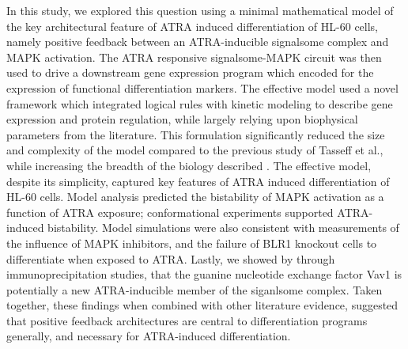 \documentclass[12pt]{article}
\begin{document}
In this study, we explored this question using a minimal mathematical model of the key architectural feature of ATRA induced differentiation of HL-60 cells,
namely positive feedback between an ATRA-inducible signalsome complex and MAPK activation.
The ATRA responsive signalsome-MAPK circuit was then used to drive a downstream gene expression program which encoded for the expression of functional differentiation markers.
The effective model used a novel framework which integrated logical rules with kinetic modeling to describe gene expression and protein regulation,
while largely relying upon biophysical parameters from the literature.
This formulation significantly reduced the size and complexity of the model compared to the previous study of Tasseff et al., while increasing the breadth of the biology described \cite{Tasseff2011}.
The effective model, despite its simplicity, captured key features of ATRA induced differentiation of HL-60 cells.
Model analysis predicted the bistability of MAPK activation as a function of ATRA exposure; conformational experiments supported ATRA-induced bistability.
Model simulations were also consistent with measurements of the influence of MAPK inhibitors, and the failure of BLR1 knockout cells to differentiate when exposed to ATRA.
Lastly, we showed by through immunoprecipitation studies, that the guanine nucleotide exchange factor Vav1 is potentially a new ATRA-inducible member of the siganlsome complex.
Taken together, these findings when combined with other literature evidence,
suggested that positive feedback architectures are central to differentiation programs generally, and necessary for ATRA-induced differentiation.


\clearpage
\end{document}
